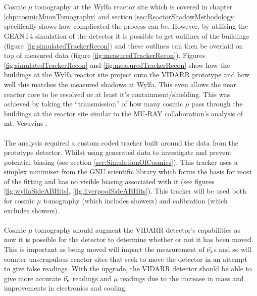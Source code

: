 \\\\Cosmic $\mu$ tomography at the Wylfa reactor site which is covered in chapter  \ref{chp:cosmicMuonTomography} and section \ref{sec:ReactorShadowMethodology} specifically shows how complicated the process can be. However, by utilising the GEANT4 simulation of the detector it is possible to get outlines of the buildings (figure \ref{fig:simulatedTrackerRecon}) and these outlines can then be overlaid on top of measured data (figure \ref{fig:measuredTrackerRecon}). Figures \ref{fig:simulatedTrackerRecon} and \ref{fig:measuredTrackerRecon} show how the buildings at the Wylfa reactor site project onto the VIDARR prototype and how well this matches the measured shadows at Wylfa. This even allows the near reactor core to be resolved or at least it's containment/shielding. This was achieved by taking the ``transmission'' of how many cosmic $\mu$ pass through the buildings at the reactor site similar to the  MU-RAY collaboration's analysis of mt. Vesuvius \cite{Ambrosino_2014}.    
\\\\The analysis required a custom coded tracker built around the data from the prototype detector. Whilst using generated data to investigate and prevent potential biasing (see section \ref{sec:SimulationOfCosmics}). This tracker uses a simplex minimiser from the GNU scientific library \cite{galassi2002gnu} which forms the basis for most of the fitting and has no visible biasing associated with it (see figures \ref{fig:wylfaSideABHits}, \ref{fig:liverpoolSideABHits}). This tracker will be used both for cosmic $\mu$ tomography (which includes showers) and calibration (which excludes showers). 
\\\\Cosmic $\mu$ tomography should augment the VIDARR detector's capabilities as now it is possible for the detector to determine whether or not it has been moved. This is important as being moved will impact the measurement of $\Bar{\nu_e}$s and so will counter unscrupulous reactor sites that seek to move the detector in an attempt to give false readings. With the upgrade, the VIDARR detector should be able to give more accurate $\Bar{\nu_e}$ readings and $\mu$ readings due to the increase in mass and improvements in electronics and cooling. 